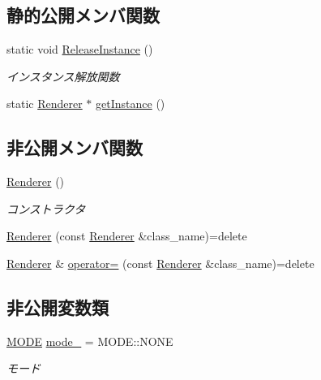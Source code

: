 \subsection*{静的公開メンバ関数}
\begin{DoxyCompactItemize}
\item 
static void \mbox{\hyperlink{class_renderer_aa7ac523172faaf376ecddaed4bdc0781}{Release\+Instance}} ()
\begin{DoxyCompactList}\small\item\em インスタンス解放関数 \end{DoxyCompactList}\item 
static \mbox{\hyperlink{class_renderer}{Renderer}} $\ast$ \mbox{\hyperlink{class_renderer_ac1bf10ff8b4f967f0d416a26d482abd6}{get\+Instance}} ()
\end{DoxyCompactItemize}
\subsection*{非公開メンバ関数}
\begin{DoxyCompactItemize}
\item 
\mbox{\hyperlink{class_renderer_a7ebf46f54dab9905f79b80f7fddb76a6}{Renderer}} ()
\begin{DoxyCompactList}\small\item\em コンストラクタ \end{DoxyCompactList}\item 
\mbox{\hyperlink{class_renderer_a1e7732f4c952f3c13d9bb03a7510b7aa}{Renderer}} (const \mbox{\hyperlink{class_renderer}{Renderer}} \&class\+\_\+name)=delete
\item 
\mbox{\hyperlink{class_renderer}{Renderer}} \& \mbox{\hyperlink{class_renderer_ab80abe5f35a095f221f8c43916900d66}{operator=}} (const \mbox{\hyperlink{class_renderer}{Renderer}} \&class\+\_\+name)=delete
\end{DoxyCompactItemize}
\subsection*{非公開変数類}
\begin{DoxyCompactItemize}
\item 
\mbox{\hyperlink{class_renderer_ab5a9379ccadcf2b3394c61cf8c835fec}{M\+O\+DE}} \mbox{\hyperlink{class_renderer_adaed44b3c6c8b0879b8cd52f677941cf}{mode\+\_\+}} = M\+O\+D\+E\+::\+N\+O\+NE
\begin{DoxyCompactList}\small\item\em モード \end{DoxyCompactList}\end{DoxyCompactItemize}
